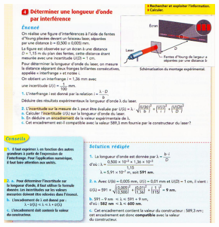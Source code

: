 \documentclass[11pt,a4paper]{article}
\begin{document}
\begin{figure}[H]
    \centering
    \includegraphics[width=\linewidth]{imgs/p5/xoINTERFER.jpg}
\end{figure}
\end{document}
